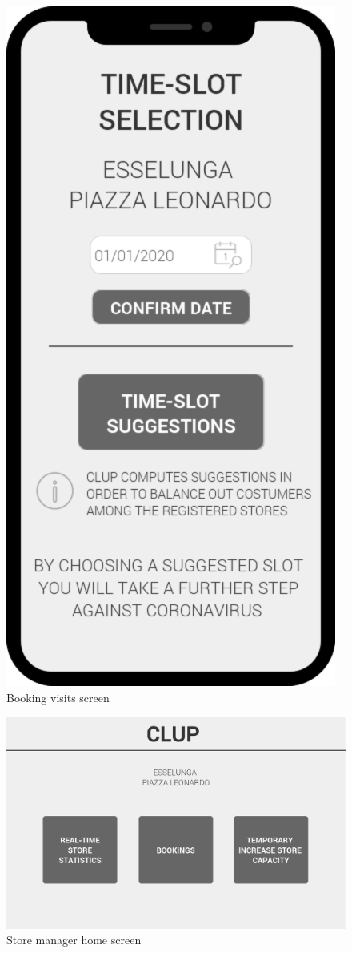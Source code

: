 \documentclass[]{article}
\begin{document}
			\begin{figure}[H]
				\centering
				\includegraphics[scale=0.3]{timeSlotSelection.png}
				\caption{Booking visits screen}
				\label{fig:BookingVisitsMockup}
			\end{figure}
			
			\begin{figure}[H]
				\centering
				\includegraphics[scale=0.3]{webAppHome.png}
				\caption{Store manager home screen}
				\label{fig:ManagerHomeMockup}
			\end{figure}
		
\end{document}
